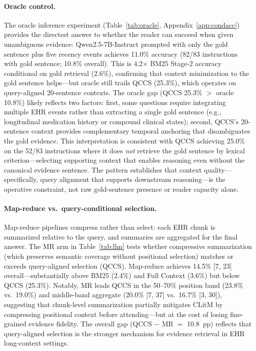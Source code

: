 \documentclass{article}
\begin{document}
\paragraph{Oracle control.}
The oracle inference experiment (Table~\ref{tab:oracle}, Appendix~\ref{app:condacc})
provides the directest answer to whether the reader can succeed when given
unambiguous evidence: Qwen2.5-7B-Instruct prompted with only the gold sentence
plus five recency events achieves 11.0\% accuracy (82/83 instructions with gold
sentence; 10.8\% overall). This is 4.2$\times$ BM25 Stage-2 accuracy
conditional on gold retrieval (2.6\%), confirming that context minimization to
the gold sentence helps---but oracle still trails QCCS (25.3\%), which operates
on query-aligned 20-sentence contexts.
The oracle gap (QCCS 25.3\% $>$ oracle 10.8\%) likely reflects two factors:
first, some questions require integrating multiple EHR events rather than
extracting a single gold sentence (e.g., longitudinal medication history or
compound clinical states); second, QCCS's 20-sentence context provides
complementary temporal anchoring that disambiguates the gold evidence. This
interpretation is consistent with QCCS achieving 25.0\% on the 52/83 instructions
where it does \emph{not} retrieve the gold sentence by lexical criterion---selecting
supporting context that enables reasoning even without the canonical evidence sentence.
The pattern establishes that context quality---specifically, query alignment that
supports downstream reasoning---is the operative constraint, not raw gold-sentence
presence or reader capacity alone.

\paragraph{Map-reduce vs.\ query-conditional selection.}
Map-reduce pipelines compress rather than select: each EHR chunk is summarized
relative to the query, and summaries are aggregated for the final answer.
The MR arm in Table~\ref{tab:llm} tests whether compressive summarization
(which preserves semantic coverage without positional selection) matches or
exceeds query-aligned selection (QCCS). Map-reduce achieves 14.5\% [7, 23]
overall---substantially above BM25 (2.4\%) and Full Context (3.6\%) but below
QCCS (25.3\%). Notably, MR leads QCCS in the 50--70\% position band (23.8\%
vs.\ 19.0\%) and middle-band aggregate (20.0\% [7, 37] vs.\ 16.7\% [3, 30]),
suggesting that chunk-level summarization partially mitigates CLitM by
compressing positional context before attending---but at the cost of losing
fine-grained evidence fidelity. The overall gap (QCCS $-$ MR $=$ 10.8~pp)
reflects that query-aligned selection is the stronger mechanism for evidence
retrieval in EHR long-context settings.
\end{document}
